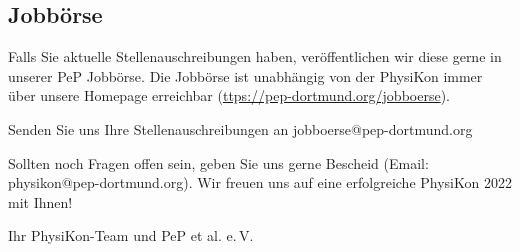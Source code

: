 \documentclass[
  paper=a4,
  fontsize=12pt,
  DIV=16,
  headheight=30pt,
  footheight=45pt,
  headinclude,
  parskip=half,
]{scrartcl}
\begin{document}
\subsection*{Jobbörse}

Falls Sie aktuelle Stellenauschreibungen haben, veröffentlichen wir diese gerne in unserer PeP Jobbörse.
Die Jobbörse ist unabhängig von der PhysiKon immer über unsere Homepage erreichbar (\url{ttps://pep-dortmund.org/jobboerse}).

Senden Sie uns Ihre Stellenauschreibungen an jobboerse@pep-dortmund.org



Sollten noch Fragen offen sein, geben Sie uns gerne Bescheid (Email: physikon@pep-dortmund.org).
Wir freuen uns auf eine erfolgreiche PhysiKon 2022 mit Ihnen!

\vspace{1cm}
Ihr PhysiKon-Team und PeP et al. e.\,V.
\end{document}
